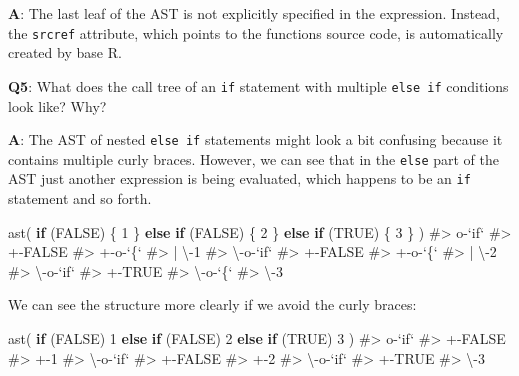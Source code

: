 \documentclass[
]{krantz}
\makeatletter
\newenvironment{Shaded}{\begin{snugshade}}{\end{snugshade}}
\newcommand{\CommentTok}[1]{\textcolor[rgb]{0.56,0.35,0.01}{\textit{#1}}}
\newcommand{\ControlFlowTok}[1]{\textcolor[rgb]{0.13,0.29,0.53}{\textbf{#1}}}
\newcommand{\DecValTok}[1]{\textcolor[rgb]{0.00,0.00,0.81}{#1}}
\newcommand{\KeywordTok}[1]{\textcolor[rgb]{0.13,0.29,0.53}{\textbf{#1}}}
\newcommand{\NormalTok}[1]{#1}
\newcommand{\OtherTok}[1]{\textcolor[rgb]{0.56,0.35,0.01}{#1}}
\newenvironment{kframe}{%
\medskip{}
\setlength{\fboxsep}{.8em}
 \def\at@end@of@kframe{}%
 \ifinner\ifhmode%
  \def\at@end@of@kframe{\end{minipage}}%
  \begin{minipage}{\columnwidth}%
 \fi\fi%
 \def\FrameCommand##1{\hskip\@totalleftmargin \hskip-\fboxsep
 \colorbox{shadecolor}{##1}\hskip-\fboxsep
     \hskip-\linewidth \hskip-\@totalleftmargin \hskip\columnwidth}%
 \MakeFramed {\advance\hsize-\width
   \@totalleftmargin\z@ \linewidth\hsize
   \@setminipage}}%
 {\par\unskip\endMakeFramed%
 \at@end@of@kframe}
\renewenvironment{Shaded}{\begin{kframe}}{\end{kframe}}
\renewcommand{\KeywordTok} [1]{\textcolor[rgb]{0.00,0.44,0.13}{{#1}}}
\renewcommand{\DecValTok}  [1]{\textcolor[rgb]{0.25,0.63,0.44}{{#1}}}
\renewcommand{\CommentTok} [1]{\textcolor[rgb]{0.38,0.63,0.69}{{#1}}}
\renewcommand{\OtherTok}   [1]{\textcolor[rgb]{0.00,0.44,0.13}{{#1}}}
\renewcommand{\NormalTok}  [1]{{#1}}
\makeatother
\begin{document}
\textbf{{A}}: The last leaf of the AST is not explicitly specified in the expression. Instead, the \texttt{srcref} attribute, which points to the functions source code, is automatically created by base R.

\textbf{{Q5}}: What does the call tree of an \texttt{if} statement with multiple \texttt{else\ if} conditions look like? Why?

\textbf{{A}}: The AST of nested \texttt{else\ if} statements might look a bit confusing because it contains multiple curly braces. However, we can see that in the \texttt{else} part of the AST just another expression is being evaluated, which happens to be an \texttt{if} statement and so forth.

\begin{Shaded}
\begin{Highlighting}[]
\KeywordTok{ast}\NormalTok{(}
  \ControlFlowTok{if}\NormalTok{ (}\OtherTok{FALSE}\NormalTok{) \{}
    \DecValTok{1}
\NormalTok{  \} }\ControlFlowTok{else} \ControlFlowTok{if}\NormalTok{ (}\OtherTok{FALSE}\NormalTok{) \{}
    \DecValTok{2}
\NormalTok{  \} }\ControlFlowTok{else} \ControlFlowTok{if}\NormalTok{ (}\OtherTok{TRUE}\NormalTok{) \{}
    \DecValTok{3}
\NormalTok{  \}}
\NormalTok{)}
\CommentTok{#> o-`if` }
\CommentTok{#> +-FALSE }
\CommentTok{#> +-o-`\{` }
\CommentTok{#> | \textbackslash{}-1 }
\CommentTok{#> \textbackslash{}-o-`if` }
\CommentTok{#>   +-FALSE }
\CommentTok{#>   +-o-`\{` }
\CommentTok{#>   | \textbackslash{}-2 }
\CommentTok{#>   \textbackslash{}-o-`if` }
\CommentTok{#>     +-TRUE }
\CommentTok{#>     \textbackslash{}-o-`\{` }
\CommentTok{#>       \textbackslash{}-3}
\end{Highlighting}
\end{Shaded}

We can see the structure more clearly if we avoid the curly braces:

\begin{Shaded}
\begin{Highlighting}[]
\KeywordTok{ast}\NormalTok{(}
  \ControlFlowTok{if}\NormalTok{ (}\OtherTok{FALSE}\NormalTok{) }\DecValTok{1} 
  \ControlFlowTok{else} \ControlFlowTok{if}\NormalTok{ (}\OtherTok{FALSE}\NormalTok{) }\DecValTok{2} 
  \ControlFlowTok{else} \ControlFlowTok{if}\NormalTok{ (}\OtherTok{TRUE}\NormalTok{) }\DecValTok{3}
\NormalTok{)}
\CommentTok{#> o-`if` }
\CommentTok{#> +-FALSE }
\CommentTok{#> +-1 }
\CommentTok{#> \textbackslash{}-o-`if` }
\CommentTok{#>   +-FALSE }
\CommentTok{#>   +-2 }
\CommentTok{#>   \textbackslash{}-o-`if` }
\CommentTok{#>     +-TRUE }
\CommentTok{#>     \textbackslash{}-3}
\end{Highlighting}
\end{Shaded}
\end{document}
